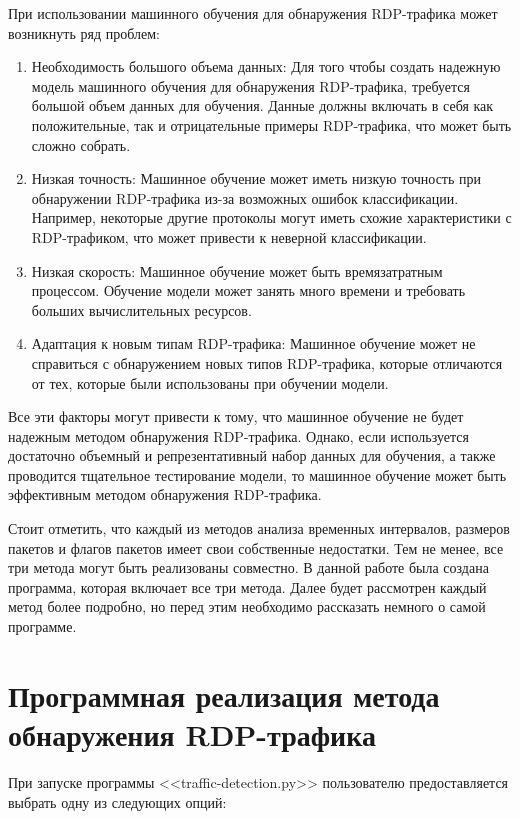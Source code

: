\documentclass[bachelor, och, coursework]{SCWorks}
\begin{document}
При использовании машинного обучения для обнаружения RDP-трафика может возникнуть ряд проблем:

\begin{enumerate}
  \item Необходимость большого объема данных: Для того чтобы создать надежную модель машинного обучения для обнаружения RDP-трафика, 
  требуется большой объем данных для обучения. Данные должны включать в себя как положительные, так и отрицательные примеры RDP-трафика, 
  что может быть сложно собрать.
  \item Низкая точность: Машинное обучение может иметь низкую точность при обнаружении RDP-трафика из-за возможных ошибок классификации. 
  Например, некоторые другие протоколы могут иметь схожие характеристики с RDP-трафиком, что может привести к неверной классификации.
  \item Низкая скорость: Машинное обучение может быть времязатратным процессом. Обучение модели может занять много времени и требовать 
  больших вычислительных ресурсов.
  \item Адаптация к новым типам RDP-трафика: Машинное обучение может не справиться с обнаружением новых типов RDP-трафика, которые 
  отличаются от тех, которые были использованы при обучении модели.
\end{enumerate}

Все эти факторы могут привести к тому, что машинное обучение не будет надежным методом обнаружения RDP-трафика. Однако, если используется 
достаточно объемный и репрезентативный набор данных для обучения, а также проводится тщательное тестирование модели, то машинное обучение
может быть эффективным методом обнаружения RDP-трафика.



Стоит отметить, что каждый из методов анализа временных интервалов, размеров пакетов и флагов пакетов имеет свои собственные недостатки. 
Тем не менее, все три метода могут быть реализованы совместно. В данной работе была создана программа, которая включает все три метода. 
Далее будет рассмотрен каждый метод более подробно, но перед этим необходимо рассказать немного о самой программе.

\section{Программная реализация метода обнаружения RDP-трафика}

При запуске программы <<traffic-detection.py>> пользователю предоставляется выбрать одну из следующих опций:
\end{document}
